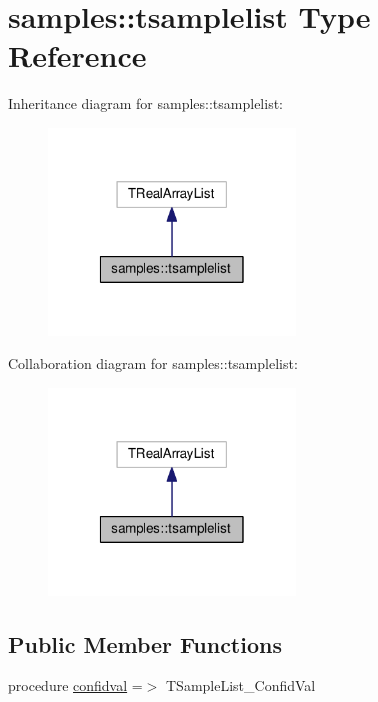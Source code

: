 \hypertarget{structsamples_1_1tsamplelist}{}\section{samples\+:\+:tsamplelist Type Reference}
\label{structsamples_1_1tsamplelist}


Inheritance diagram for samples\+:\+:tsamplelist\+:
\nopagebreak
\begin{figure}[H]
\begin{center}
\leavevmode
\includegraphics[width=186pt]{structsamples_1_1tsamplelist__inherit__graph}
\end{center}
\end{figure}


Collaboration diagram for samples\+:\+:tsamplelist\+:
\nopagebreak
\begin{figure}[H]
\begin{center}
\leavevmode
\includegraphics[width=186pt]{structsamples_1_1tsamplelist__coll__graph}
\end{center}
\end{figure}
\subsection*{Public Member Functions}
\begin{DoxyCompactItemize}
\item 
procedure \mbox{\hyperlink{structsamples_1_1tsamplelist_aff4b0a39ad4271bf69f69cba0e4b5650}{confidval}} =$>$ T\+Sample\+List\+\_\+\+Confid\+Val
\end{DoxyCompactItemize}


